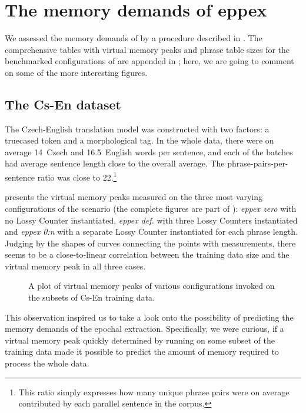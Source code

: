 \section{The memory demands of eppex}
\label{sec:eppex-memory-demands}

We assessed the memory demands of \eppex{} by a procedure described in .
The comprehensive tables with virtual memory peaks and phrase table sizes for the benchmarked
configurations of \eppex{} are appended in ; here, we are going
to comment on some of the more interesting figures.

\subsection{The Cs-En dataset}

The Czech-English translation model was constructed with two factors: a truecased token and
a morphological tag.
In the whole data, there were on average 14~Czech and 16.5~English words per sentence,
and each of the batches had average sentence length close to the overall average.
The phrase-pairs-per-sentence ratio was close to 22.\footnote{This ratio simply expresses
how many unique phrase pairs were on average contributed by each parallel sentence in
the corpus.}

 presents the virtual memory peaks measured on the three most varying
configurations of the \eppex{} scenario (the complete figures are part of ):
\emph{eppex zero} with no Lossy Counter instantiated,
\emph{eppex def.} with three Lossy Counters instantiated and \emph{eppex 0:n} with
a separate Lossy Counter instantiated for each phrase length.
Judging by the shapes of curves connecting the points with measurements, there seems to be
a close-to-linear correlation between the training data size and the virtual memory peak in all
three cases.

\begin{figure}[!htb]
  \centering
  
  \caption{
    A plot of virtual memory peaks of various \eppex{} configurations invoked on the subsets of Cs-En training data.
  }
  \label{fig:cs-en-vm-peaks}
\end{figure}

This observation inspired us to take a look onto the possibility of predicting the memory
demands of the epochal extraction.
Specifically, we were curious, if a virtual memory peak quickly determined by running
\eppex{} on some subset of the training data made it possible to predict the amount of
memory required to process the whole data.

